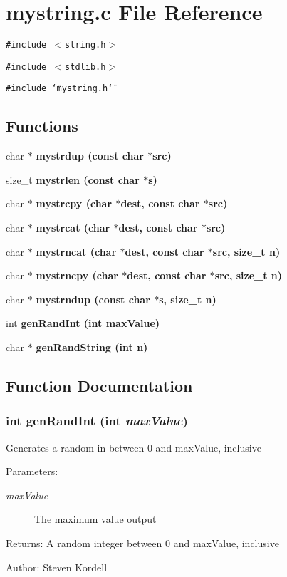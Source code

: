 \section{mystring.c File Reference}
\label{mystring_8c}
{\tt \#include $<$string.h$>$}\par
{\tt \#include $<$stdlib.h$>$}\par
{\tt \#include \char`\"{}mystring.h\char`\"{}}\par
\subsection*{Functions}
\begin{CompactItemize}
\item 
char $\ast$ \bf{mystrdup} (const char $\ast$src)
\item 
size\_\-t \bf{mystrlen} (const char $\ast$s)
\item 
char $\ast$ \bf{mystrcpy} (char $\ast$dest, const char $\ast$src)
\item 
char $\ast$ \bf{mystrcat} (char $\ast$dest, const char $\ast$src)
\item 
char $\ast$ \bf{mystrncat} (char $\ast$dest, const char $\ast$src, size\_\-t n)
\item 
char $\ast$ \bf{mystrncpy} (char $\ast$dest, const char $\ast$src, size\_\-t n)
\item 
char $\ast$ \bf{mystrndup} (const char $\ast$s, size\_\-t n)
\item 
int \bf{gen\-Rand\-Int} (int max\-Value)
\item 
char $\ast$ \bf{gen\-Rand\-String} (int n)
\end{CompactItemize}


\subsection{Function Documentation}
\subsubsection{\setlength{\rightskip}{0pt plus 5cm}int gen\-Rand\-Int (int {\em max\-Value})}\label{mystring_8c_c4418fa1a8e694adecb1016209595ae1}


Generates a random in between 0 and max\-Value, inclusive \begin{Desc}
\item[Parameters:]
\begin{description}
\item[{\em max\-Value}]The maximum value output \end{description}
\end{Desc}
\begin{Desc}
\item[Returns:]A random integer between 0 and max\-Value, inclusive \end{Desc}
\begin{Desc}
\item[Author:]Steven Kordell \end{Desc}
